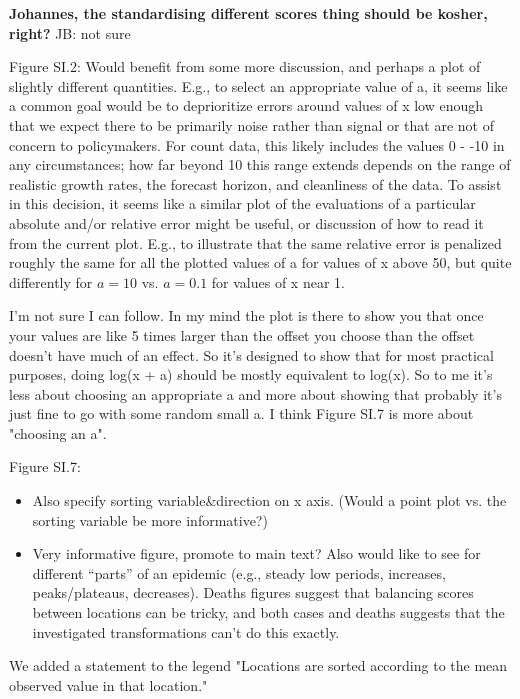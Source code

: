 \documentclass{article}
\newcommand{\red}{\color{red}}
\newcommand{\black}{\color{black}}
\newcommand{\blue}{\color{blue}}
\begin{document}
\textbf{Johannes, the standardising different scores thing should be kosher, right?} JB: not sure

\red
Figure SI.2: Would benefit from some more discussion, and perhaps a plot of slightly different quantities. E.g., to select an appropriate value of a, it seems like a common goal would be to deprioritize errors around values of x low enough that we expect there to be primarily noise rather than signal or that are not of concern to policymakers. For count data, this likely includes the values 0 - -10 in any circumstances; how far beyond 10 this range extends depends on the range of realistic growth rates, the forecast horizon, and cleanliness of the data. To assist in this decision, it seems like a similar plot of the evaluations of a particular absolute and/or relative error might be useful, or discussion of how to read it from the current plot. E.g., to illustrate that the same relative error is penalized roughly the same for all the plotted values of a for values of x above 50, but quite differently for $a = 10$ vs. $a = 0.1$ for values of x near 1.

\black
I'm not sure I can follow. In my mind the plot is there to show you that once your values are like 5 times larger than the offset you choose than the offset doesn't have much of an effect. So it's designed to show that for most practical purposes, doing log(x + a) should be mostly equivalent to log(x). So to me it's less about choosing an appropriate a and more about showing that probably it's just fine to go with some random small a. I think Figure SI.7 is more about "choosing an a". 

\red
Figure SI.7:
\begin{itemize}
    \blue
    \item Also specify sorting variable\&direction on x axis. (Would a point plot vs. the sorting variable be more informative?)
    \red
    \item Very informative figure, promote to main text? Also would like to see for different “parts” of an epidemic (e.g., steady low periods, increases, peaks/plateaus, decreases). Deaths figures suggest that balancing scores between locations can be tricky, and both cases and deaths suggests that the investigated transformations can’t do this exactly.
\end{itemize}

\black
We added a statement to the legend "Locations are sorted according to the mean observed value in that location."
\end{document}
